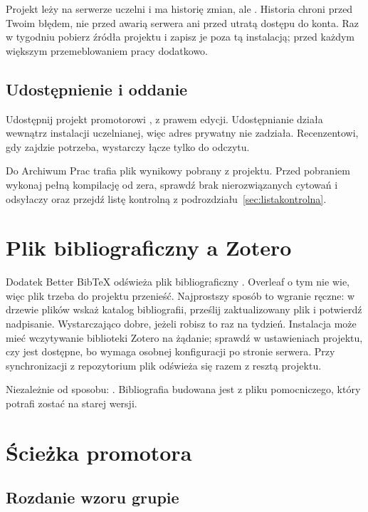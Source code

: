 Projekt leży na serwerze uczelni i ma historię zmian, ale . Historia chroni przed Twoim błędem, nie przed awarią serwera ani przed utratą dostępu do konta. Raz w tygodniu pobierz źródła projektu i zapisz je poza tą instalacją; przed każdym większym przemeblowaniem pracy dodatkowo.

\subsection{Udostępnienie i oddanie}

Udostępnij projekt promotorowi , z prawem edycji. Udostępnianie działa wewnątrz instalacji uczelnianej, więc adres prywatny nie zadziała. Recenzentowi, gdy zajdzie potrzeba, wystarczy łącze tylko do odczytu.

Do Archiwum Prac trafia plik wynikowy pobrany z projektu. Przed pobraniem wykonaj pełną kompilację od zera, sprawdź brak nierozwiązanych cytowań i odsyłaczy oraz przejdź listę kontrolną z podrozdziału~\ref{sec:listakontrolna}.

\section{Plik bibliograficzny a Zotero}

Dodatek Better BibTeX odświeża plik bibliograficzny . Overleaf o tym nie wie, więc plik trzeba do projektu przenieść. Najprostszy sposób to wgranie ręczne: w drzewie plików wskaż katalog bibliografii, prześlij zaktualizowany plik i potwierdź nadpisanie. Wystarczająco dobre, jeżeli robisz to raz na tydzień. Instalacja może mieć wczytywanie biblioteki Zotero na żądanie; sprawdź w ustawieniach projektu, czy jest dostępne, bo wymaga osobnej konfiguracji po stronie serwera. Przy synchronizacji z repozytorium plik odświeża się razem z resztą projektu.

Niezależnie od sposobu: . Bibliografia budowana jest z pliku pomocniczego, który potrafi zostać na starej wersji.

\section{Ścieżka promotora}

\subsection{Rozdanie wzoru grupie}

